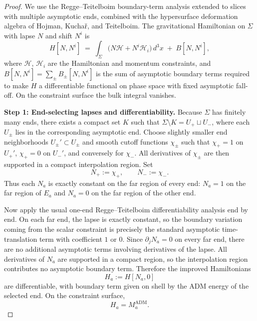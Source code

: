 \documentclass[aps,prd,onecolumn,nofootinbib,superscriptaddress]{revtex4-2}
\begin{document}
\begin{proof}
We use the Regge--Teitelboim boundary-term analysis extended to slices with multiple asymptotic ends,\cite{ReggeTeitelboim1974SurfaceIntegrals,Wald1984GeneralRelativity} combined with the hypersurface deformation algebra of Hojman, Kucha\v{r}, and Teitelboim.\cite{HojmanKucharTeitelboim1976Geometrodynamics} The gravitational Hamiltonian on $\Sigma$ with lapse $N$ and shift $N^i$ is
\begin{equation}
H[N,N^i] \;=\; \int_\Sigma \!\big(N\mathcal{H} + N^i\mathcal{H}_i\big)\, d^3x \;+\; B[N,N^i],
\end{equation}
where $\mathcal{H}$, $\mathcal{H}_i$ are the Hamiltonian and momentum constraints, and $B[N,N^i] = \sum_\pm B_\pm[N,N^i]$ is the sum of asymptotic boundary terms required to make $H$ a differentiable functional on phase space with fixed asymptotic fall-off. On the constraint surface the bulk integral vanishes.

\textbf{Step 1: End-selecting lapses and differentiability.} Because $\Sigma$ has finitely many ends, there exists a compact set $K$ such that $\Sigma\setminus K = U_+ \sqcup U_-$, where each $U_\pm$ lies in the corresponding asymptotic end. Choose slightly smaller end neighborhoods $U_\pm' \subset U_\pm$ and smooth cutoff functions $\chi_\pm$ such that $\chi_+=1$ on $U_+'$, $\chi_+=0$ on $U_-'$, and conversely for $\chi_-$. All derivatives of $\chi_\pm$ are then supported in a compact interpolation region. Set
\begin{equation}
N_+ := \chi_+,\qquad N_- := \chi_-.
\end{equation}
Thus each $N_a$ is exactly constant on the far region of every end: $N_a=1$ on the far region of $E_a$ and $N_a=0$ on the far region of the other end.

Now apply the usual one-end Regge--Teitelboim differentiability analysis end by end.\cite{ReggeTeitelboim1974SurfaceIntegrals} On each far end, the lapse is exactly constant, so the boundary variation coming from the scalar constraint is precisely the standard asymptotic time-translation term with coefficient $1$ or $0$. Since $\partial_j N_a=0$ on every far end, there are no additional asymptotic terms involving derivatives of the lapse. All derivatives of $N_a$ are supported in a compact region, so the interpolation region contributes no asymptotic boundary term. Therefore the improved Hamiltonians
\begin{equation}
H_a := H[N_a,0]
\end{equation}
are differentiable, with boundary term given on shell by the ADM energy of the selected end. On the constraint surface,
\begin{equation}
H_a = M_a^{\mathrm{ADM}}.
\end{equation}


\end{proof}
\end{document}
